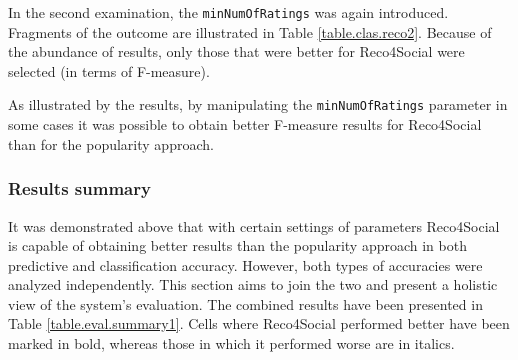 \documentclass[12pt]{report}
\begin{document}
In the second examination, the \texttt{min\-Num\-Of\-Ratings} was again introduced. Fragments of the outcome are illustrated in Table \ref{table.clas.reco2}. Because of the abundance of results, only those that were better for Reco4Social were selected (in terms of F-measure).

As illustrated by the results, by manipulating the \texttt{min\-Num\-Of\-Ratings} parameter in some cases it was possible to obtain better F-measure results for Reco4Social than for the popularity approach.

\subsubsection{Results summary}

It was demonstrated above that with certain settings of parameters Reco4Social is capable of obtaining better results than the popularity approach in both predictive and classification accuracy. However, both types of accuracies were analyzed independently. This section aims to join the two and present a holistic view of the system's evaluation. The combined results have been presented in Table \ref{table.eval.summary1}. Cells where Reco4Social performed better have been marked in bold, whereas those in which it performed worse are in italics.
\end{document}
